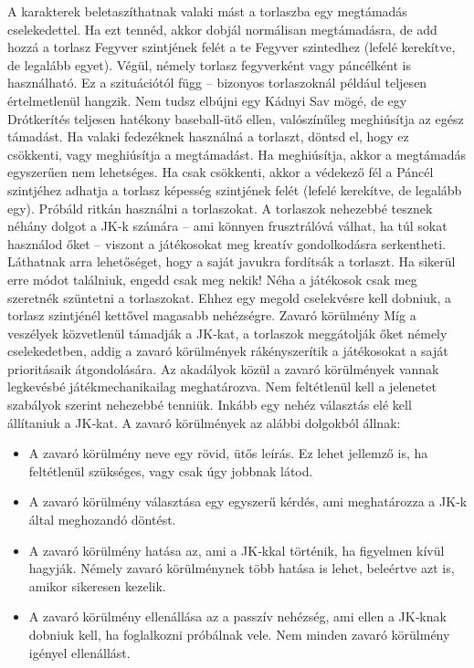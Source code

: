 \documentclass[oneside]{book}
\begin{document}
A karakterek beletaszíthatnak valaki mást a torlaszba egy megtámadás cselekedettel. Ha ezt tennéd, akkor dobjál normálisan megtámadásra, de add hozzá a torlasz Fegyver szintjének felét a te Fegyver szintedhez (lefelé kerekítve, de legalább egyet).
Végül, némely torlasz fegyverként vagy páncélként is használható. Ez a szituációtól függ – bizonyos torlaszoknál például teljesen értelmetlenül hangzik. Nem tudsz elbújni egy Kádnyi Sav mögé, de egy  Drótkerítés teljesen hatékony baseball‑ütő ellen, valószínűleg meghiúsítja az egész támadást.
Ha valaki fedezéknek használná a torlaszt, döntsd el, hogy ez csökkenti, vagy meghiúsítja a megtámadást. Ha meghiúsítja, akkor a megtámadás egyszerűen nem lehetséges. Ha csak csökkenti, akkor a védekező fél a Páncél szintjéhez adhatja a torlasz képesség szintjének felét (lefelé kerekítve, de legalább egy).
Próbáld ritkán használni a torlaszokat. A torlaszok nehezebbé tesznek néhány dolgot a JK‑k számára – ami könnyen frusztrálóvá válhat, ha túl sokat használod őket – viszont a játékosokat meg kreatív gondolkodásra serkentheti. Láthatnak arra lehetőséget, hogy a saját javukra fordítsák a torlaszt. Ha sikerül erre módot találniuk, engedd csak meg nekik!
Néha a játékosok csak meg szeretnék szüntetni a torlaszokat. Ehhez egy megold cselekvésre kell dobniuk, a torlasz szintjénél kettővel magasabb nehézségre.
Zavaró körülmény
Míg a veszélyek közvetlenül támadják a JK‑kat, a torlaszok meggátolják őket némely cselekedetben, addig a zavaró körülmények rákényszerítik a játékosokat a saját prioritásaik átgondolására. Az akadályok közül a zavaró körülmények vannak legkevésbé játékmechanikailag meghatározva. Nem feltétlenül kell a jelenetet szabályok szerint nehezebbé tenniük. Inkább egy nehéz választás elé kell állítaniuk a JK‑kat. A zavaró körülmények az alábbi dolgokból állnak:

\begin{itemize}
    \item A zavaró körülmény neve egy rövid, ütős leírás. Ez lehet jellemző is, ha feltétlenül szükséges, vagy csak úgy jobbnak látod.
    \item A zavaró körülmény választása egy egyszerű kérdés, ami meghatározza a JK‑k által meghozandó döntést.
    \item A zavaró körülmény hatása az, ami a JK‑kkal történik, ha figyelmen kívül hagyják. Némely zavaró körülménynek több hatása is lehet, beleértve azt is, amikor sikeresen kezelik.
    \item A zavaró körülmény ellenállása az a passzív nehézség, ami ellen a JK‑knak dobniuk kell, ha foglalkozni próbálnak vele. Nem minden zavaró körülmény igényel ellenállást.
\end{itemize}
\end{document}
